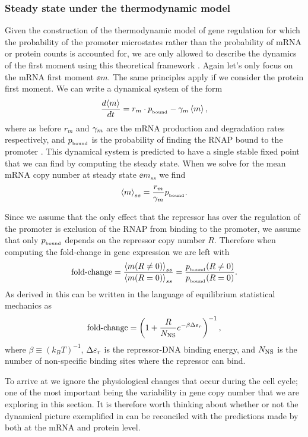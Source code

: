 \subsubsection{Steady state under the thermodynamic model}

Given the construction of the thermodynamic model of gene regulation for which
the probability of the promoter microstates rather than the probability of mRNA
or protein counts is accounted for,  we are only allowed to describe the
dynamics of the first moment using this theoretical framework
\cite{Phillips2015}. Again let's only focus on the mRNA first moment $\ee{m}$.
The same principles apply if we consider the protein first moment. We can write
a dynamical system of the form
\begin{equation}
  {d{\left\langle m \right\rangle} \over dt} = r_m \cdot p_{_\text{bound}} - \gamma _m \left\langle m \right\rangle,
\end{equation}
where as before $r_m$ and $\gamma _m$ are the mRNA production and degradation rates
respectively, and $p_{_\text{bound}}$ is the probability of finding the RNAP bound to the
promoter \cite{Bintu2005a}. This dynamical system is predicted to have a single
stable fixed point that we can find by computing the steady state. When we solve
for the mean mRNA copy number at steady state $\ee{m}_{ss}$ we find
\begin{equation}
  \left\langle m \right\rangle_{ss} = {r_m \over \gamma _m} p_{_\text{bound}}.
\end{equation}

Since we assume that the only effect that the repressor has over the regulation
of the promoter is exclusion of the RNAP from binding to the promoter, we assume
that only $p_{_\text{bound}}$ depends on the repressor copy number $R$. Therefore when
computing the fold-change in gene expression we  are left with
\begin{equation}
  \text{fold-change} = {\left\langle m (R \neq 0) \right\rangle_{ss} \over \left\langle m (R = 0) \right\rangle_{ss}}
              = {p_{_\text{bound}} (R \neq 0) \over p_{_\text{bound}} (R = 0)}.
\end{equation}
As derived in \cite{Garcia2011c} this can be written in the language of
equilibrium statistical mechanics as
\begin{equation}
  \text{fold-change} = \left(1 + {R \over N_\text{NS}}e^{-\beta \Delta\varepsilon_r}  \right)^{-1},
  \label{seq_fold_change_thermo}
\end{equation}
where $\beta \equiv (k_BT)^{-1}$, $\Delta\varepsilon_r$ is the repressor-DNA binding energy, and
$N_\text{NS}$ is the number of non-specific binding sites where the repressor can bind.

To arrive at  we ignore the physiological changes
that occur during the cell cycle; one of the most important being the
variability in gene copy number that we are exploring in this section. It is
therefore worth thinking about whether or not the dynamical picture exemplified
in  can be reconciled with the predictions made by
 both at the mRNA and protein level.

